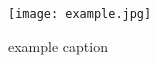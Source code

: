 \begin{figure}[htbp]
   \centering
   \texttt{[image: example.jpg]} %
   \caption{example caption}
   \label{fig:example}
\end{figure}